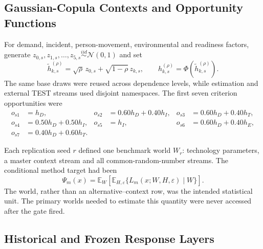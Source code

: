 \documentclass[runningheads]{llncs}
\newcommand{\E}{\mathbb{E}}
\begin{document}
\subsection{Gaussian-Copula Contexts and Opportunity Functions}

For demand, incident, person-movement, environmental and readiness factors, generate
$z_{0,s},z_{1,s},\ldots,z_{5,s}\overset{iid}{\sim}\mathcal N(0,1)$ and set
\begin{equation}
\widetilde h_{k,s}^{(\rho)}
=\sqrt{\rho}\,z_{0,s}+\sqrt{1-\rho}\,z_{k,s},
\qquad h_{k,s}^{(\rho)}=\Phi(\widetilde h_{k,s}^{(\rho)}).
\label{supp:eq:copula}
\end{equation}
The same base draws were reused across dependence levels, while estimation and external TEST
streams used disjoint namespaces. The first seven criterion opportunities were
\begin{align}
o_{s1}&=h_D, & o_{s2}&=0.60h_D+0.40h_I, & o_{s3}&=0.60h_D+0.40h_T,\nonumber\\
o_{s4}&=0.50h_D+0.50h_I, & o_{s5}&=h_I, & o_{s6}&=0.60h_D+0.40h_E,\nonumber\\
o_{s7}&=0.40h_D+0.60h_T.&&&
\label{supp:eq:opportunities}
\end{align}

Each replication seed $r$ defined one benchmark world $W_r$: technology parameters, a master
context stream and all common-random-number streams. The conditional method target had been
\begin{equation}
\Psi_m(x)=\E_W\!\left[\E_{H,\varepsilon}
\{L_m(x;W,H,\varepsilon)\mid W\}\right].
\label{supp:eq:estimand}
\end{equation}
The world, rather than an alternative--context row, was the intended statistical unit. The
primary worlds needed to estimate this quantity were never accessed after the gate fired.

\subsection{Historical and Frozen Response Layers}
\end{document}
